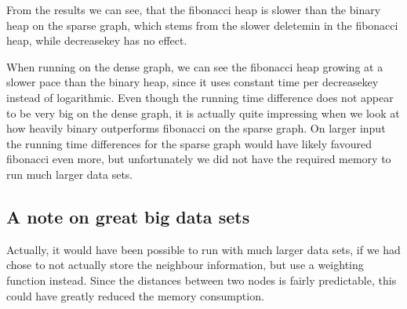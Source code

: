 From the results we can see, that the fibonacci heap is slower than the binary heap on the sparse graph, which stems from the slower deletemin in the fibonacci heap, while decreasekey has no effect.

When running on the dense graph, we can see the fibonacci heap growing at a slower pace than the binary heap, since it uses constant time per decreasekey instead of logarithmic.
Even though the running time difference does not appear to be very big on the dense graph, it is actually quite impressing when we look at how heavily binary outperforms fibonacci on the sparse graph. On larger input the running time differences for the sparse graph would have likely favoured fibonacci even more, but unfortunately we did not have the required memory to run much larger data sets.

\subsection{A note on great big data sets}

Actually, it would have been possible to run with much larger data sets, if we had chose to not actually store the neighbour information, but use a weighting function instead. Since the distances between two nodes is fairly predictable, this could have greatly reduced the memory consumption. 